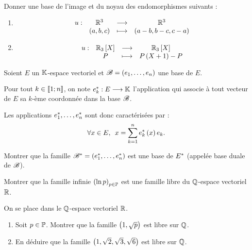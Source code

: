 \begin{corr}
\end{corr}

\begin{exo}[Exercice 18]
Donner une base de l'image et du noyau des endomorphismes suivants :

\begin{enumerate}
\item \[\begin{array}[t]{cccc}u : & \mathbb{R}^3 & \longrightarrow & \mathbb{R}^3 \\ & \left(a,b,c\right) & \longmapsto & \left(a-b,b-c,c-a\right)\end{array}\]

\item \[\fonction{u}{\polydeg[\R]{3}}{\polydeg[\R]{3}}{P}{P\paren{X+1}-P}\]
\end{enumerate}
\end{exo}

\begin{corr}
\end{corr}

\begin{exo}
Soient \(E\) un \(\mathbb{K}\)-espace vectoriel et \(\mathscr{B}=\left(e_1,\dots,e_n\right)\) une base de \(E\).

Pour tout \(k\in\left\llbracket1;n\right\rrbracket\), on note \(e_k^{*}:E\longrightarrow\mathbb{K}\) l'application qui associe à tout vecteur de \(E\) sa \(k\)-ème coordonnée dans la base \(\mathscr{B}\).

Les applications \(e_1^{*},\dots,e_n^{*}\) sont donc caractérisées par : \[\quantifs{\forall x\in E}x=\sum_{k=1}^ne_k\etoile\paren{x}e_k.\]

Montrer que la famille \(\mathscr{B}^{*}=\left(e_1^{*},\dots,e_n^{*}\right)\) est une base de \(E^{*}\) (appelée base duale de \(\mathscr{B}\)).
\end{exo}

\begin{corr}
\end{corr}

\begin{exo}[Exercice 20]
Montrer que la famille infinie \(\left(\ln p\right)_{p\in\mathbb{P}}\) est une famille libre du \(\mathbb{Q}\)-espace vectoriel \(\mathbb{R}\).
\end{exo}

\begin{corr}
\end{corr}

\begin{exo}[Exercice 21]
On se place dans le \(\mathbb{Q}\)-espace vectoriel \(\mathbb{R}\).

\begin{enumerate}
\item Soit \(p\in\mathbb{P}\). Montrer que la famille \(\left(1,\sqrt{p}\right)\) est libre sur \(\mathbb{Q}\). \\

\item En déduire que la famille \(\left(1,\sqrt{2},\sqrt{3},\sqrt{6}\right)\) est libre sur \(\mathbb{Q}\).
\end{enumerate}
\end{exo}

